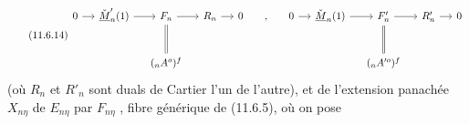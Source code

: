 \begin{equation}\tag{11.6.14}
\begin{tikzcd}[column sep=small, row sep=large]
0 \arrow[r] & \check{\underline{M}}'_n(1) \arrow[r] & F_n \arrow[r] \arrow[d, equal] & R_n \arrow[r] & 0 & , & 0 \arrow[r] & \check{\underline{M}}_n(1) \arrow[r] & F'_n \arrow[r] \arrow[d, equal] & R'_n \arrow[r] & 0 \\
& & ({}_nA^o)^f & & & & & & ({}_nA'^o)^f & &
\end{tikzcd}
\end{equation}
(où $R_n$ et $R'_n$ sont duals de Cartier l'un de l'autre), et de l'extension panachée $X_{n\eta}$ de $E_{n\eta}$ par $F_{n\eta}$ , fibre générique de (11.6.5), où on pose

